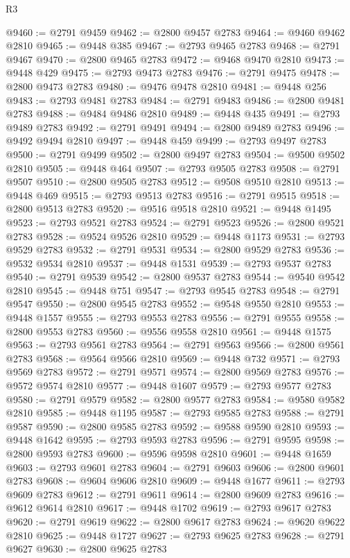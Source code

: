 \begin{lexlean}{R3}
\begin{coremodule}
@9460 := @2791 @9459
@9462 := @2800 @9457 @2783
@9464 := @9460 @9462 @2810
@9465 := @9448 @385
@9467 := @2793 @9465 @2783
@9468 := @2791 @9467
@9470 := @2800 @9465 @2783
@9472 := @9468 @9470 @2810
@9473 := @9448 @429
@9475 := @2793 @9473 @2783
@9476 := @2791 @9475
@9478 := @2800 @9473 @2783
@9480 := @9476 @9478 @2810
@9481 := @9448 @256
@9483 := @2793 @9481 @2783
@9484 := @2791 @9483
@9486 := @2800 @9481 @2783
@9488 := @9484 @9486 @2810
@9489 := @9448 @435
@9491 := @2793 @9489 @2783
@9492 := @2791 @9491
@9494 := @2800 @9489 @2783
@9496 := @9492 @9494 @2810
@9497 := @9448 @459
@9499 := @2793 @9497 @2783
@9500 := @2791 @9499
@9502 := @2800 @9497 @2783
@9504 := @9500 @9502 @2810
@9505 := @9448 @464
@9507 := @2793 @9505 @2783
@9508 := @2791 @9507
@9510 := @2800 @9505 @2783
@9512 := @9508 @9510 @2810
@9513 := @9448 @469
@9515 := @2793 @9513 @2783
@9516 := @2791 @9515
@9518 := @2800 @9513 @2783
@9520 := @9516 @9518 @2810
@9521 := @9448 @1495
@9523 := @2793 @9521 @2783
@9524 := @2791 @9523
@9526 := @2800 @9521 @2783
@9528 := @9524 @9526 @2810
@9529 := @9448 @1173
@9531 := @2793 @9529 @2783
@9532 := @2791 @9531
@9534 := @2800 @9529 @2783
@9536 := @9532 @9534 @2810
@9537 := @9448 @1531
@9539 := @2793 @9537 @2783
@9540 := @2791 @9539
@9542 := @2800 @9537 @2783
@9544 := @9540 @9542 @2810
@9545 := @9448 @751
@9547 := @2793 @9545 @2783
@9548 := @2791 @9547
@9550 := @2800 @9545 @2783
@9552 := @9548 @9550 @2810
@9553 := @9448 @1557
@9555 := @2793 @9553 @2783
@9556 := @2791 @9555
@9558 := @2800 @9553 @2783
@9560 := @9556 @9558 @2810
@9561 := @9448 @1575
@9563 := @2793 @9561 @2783
@9564 := @2791 @9563
@9566 := @2800 @9561 @2783
@9568 := @9564 @9566 @2810
@9569 := @9448 @732
@9571 := @2793 @9569 @2783
@9572 := @2791 @9571
@9574 := @2800 @9569 @2783
@9576 := @9572 @9574 @2810
@9577 := @9448 @1607
@9579 := @2793 @9577 @2783
@9580 := @2791 @9579
@9582 := @2800 @9577 @2783
@9584 := @9580 @9582 @2810
@9585 := @9448 @1195
@9587 := @2793 @9585 @2783
@9588 := @2791 @9587
@9590 := @2800 @9585 @2783
@9592 := @9588 @9590 @2810
@9593 := @9448 @1642
@9595 := @2793 @9593 @2783
@9596 := @2791 @9595
@9598 := @2800 @9593 @2783
@9600 := @9596 @9598 @2810
@9601 := @9448 @1659
@9603 := @2793 @9601 @2783
@9604 := @2791 @9603
@9606 := @2800 @9601 @2783
@9608 := @9604 @9606 @2810
@9609 := @9448 @1677
@9611 := @2793 @9609 @2783
@9612 := @2791 @9611
@9614 := @2800 @9609 @2783
@9616 := @9612 @9614 @2810
@9617 := @9448 @1702
@9619 := @2793 @9617 @2783
@9620 := @2791 @9619
@9622 := @2800 @9617 @2783
@9624 := @9620 @9622 @2810
@9625 := @9448 @1727
@9627 := @2793 @9625 @2783
@9628 := @2791 @9627
@9630 := @2800 @9625 @2783

\end{coremodule}
\end{lexlean}
